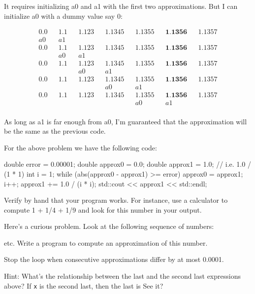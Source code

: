 It requires initializing a0 and a1 with the first two approximations.
But I can initialize a0 with a dummy value say 0:

\begin{align*}
0.0         &&1.1       &&1.123      &&1.1345      &&1.1355     &&\textbf{1.1356} &&1.1357 \\
a0         &&a1 \\
0.0         &&1.1       &&1.123      &&1.1345      &&1.1355     &&\textbf{1.1356} &&1.1357 \\
&&a0        &&a1 \\
0.0         &&1.1       &&1.123      &&1.1345      &&1.1355     &&\textbf{1.1356} &&1.1357 \\
&&&&a0       &&a1 \\
0.0         &&1.1       &&1.123      &&1.1345      &&1.1355     &&\textbf{1.1356} &&1.1357 \\
&&&&&&a0      &&a1 \\
0.0         &&1.1       &&1.123      &&1.1345      &&1.1355     &&\textbf{1.1356} &&1.1357 \\
&&&&&&&&a0      &&a1 \\
\end{align*}


As long as a1 is far enough from a0, I'm guaranteed that
the approximation will be the same as the previous code.

For the above problem we have the following code:
\begin{console}
double error = 0.00001;
double approx0 = 0.0;
double approx1 = 1.0; // i.e. 1.0 / (1 * 1)
int i = 1;
while (abs(approx0 - approx1) >= error)
{     
      approx0 = approx1;
      i++;
      approx1 += 1.0 / (i * i);
      std::cout << approx1 << std::endl;
}
\end{console}

Verify by hand that your program works. For instance, use a calculator
to compute 1 + 1/4 + 1/9 and look for this number in your output.

Here's a curious problem. Look at the following sequence
of numbers:


etc. Write a program to compute an approximation of this number.

Stop the loop when consecutive approximations differ by at most 0.0001.

Hint: What's the relationship between the last and the
second last expressions above? If \texttt{x} is the second last, then the
last is
See it?


